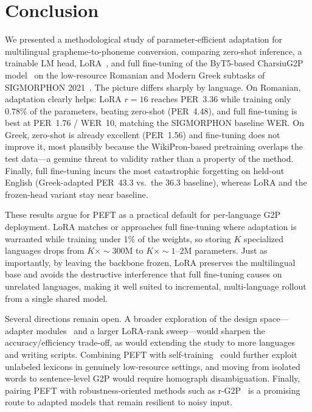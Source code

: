 \documentclass[conference]{IEEEtran}
\begin{document}
\section{Conclusion}\label{sec:conclusion}

We presented a methodological study of parameter-efficient adaptation for multilingual grapheme-to-phoneme conversion, comparing zero-shot inference, a trainable LM head, LoRA~\cite{hu2021}, and full fine-tuning of the ByT5-based CharsiuG2P model~\cite{zhu2022,xue2022byt5} on the low-resource Romanian and Modern Greek subtasks of SIGMORPHON 2021~\cite{ashby2021}. The picture differs sharply by language. On Romanian, adaptation clearly helps: LoRA $r{=}16$ reaches PER~3.36 while training only 0.78\% of the parameters, beating zero-shot (PER~4.48), and full fine-tuning is best at PER~1.76 / WER~10, matching the SIGMORPHON baseline WER. On Greek, zero-shot is already excellent (PER~1.56) and fine-tuning does not improve it, most plausibly because the WikiPron-based pretraining overlaps the test data---a genuine threat to validity rather than a property of the method. Finally, full fine-tuning incurs the most catastrophic forgetting on held-out English (Greek-adapted PER~43.3 vs.\ the 36.3 baseline), whereas LoRA and the frozen-head variant stay near baseline.

These results argue for PEFT as a practical default for per-language G2P deployment. LoRA matches or approaches full fine-tuning where adaptation is warranted while training under 1\% of the weights, so storing $K$ specialized languages drops from $K\times{\sim}300$M to $K\times{\sim}1$--$2$M parameters. Just as importantly, by leaving the backbone frozen, LoRA preserves the multilingual base and avoids the destructive interference that full fine-tuning causes on unrelated languages, making it well suited to incremental, multi-language rollout from a single shared model.

Several directions remain open. A broader exploration of the design space---adapter modules~\cite{houlsby2019} and a larger LoRA-rank sweep---would sharpen the accuracy/efficiency trade-off, as would extending the study to more languages and writing scripts. Combining PEFT with self-training~\cite{vesik2020} could further exploit unlabeled lexicons in genuinely low-resource settings, and moving from isolated words to sentence-level G2P would require homograph disambiguation. Finally, pairing PEFT with robustness-oriented methods such as r-G2P~\cite{zhao2022} is a promising route to adapted models that remain resilient to noisy input.



\end{document}
